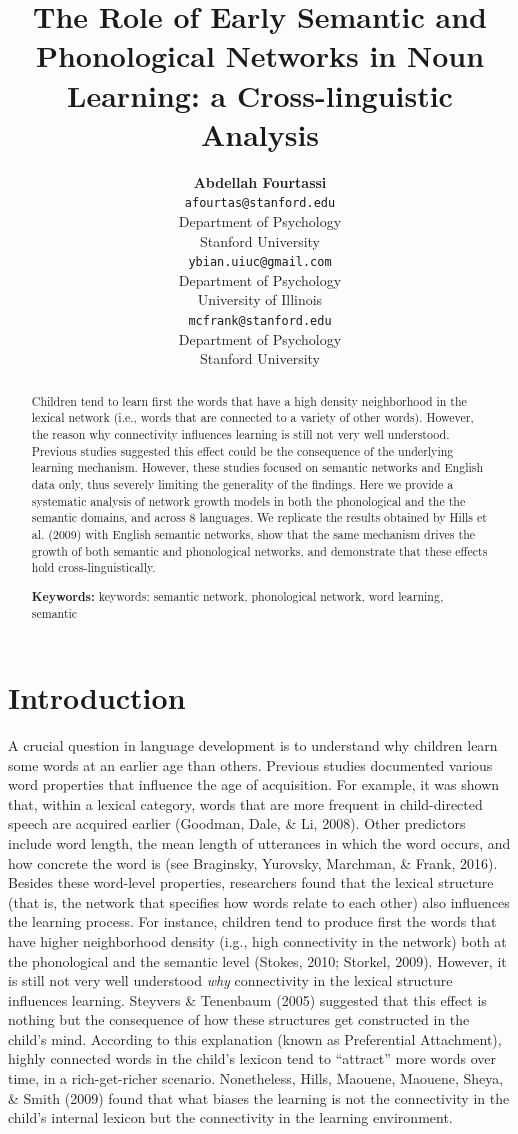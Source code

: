 \documentclass[10pt, letterpaper]{article}
\title{The Role of Early Semantic and Phonological Networks in Noun Learning: a
Cross-linguistic Analysis}
\author{{\large \bf Abdellah Fourtassi} \\ \texttt{afourtas@stanford.edu} \\ Department of Psychology \\ Stanford University \And {\large \bf Yuan Bian} \\ \texttt{ybian.uiuc@gmail.com} \\ Department of Psychology \\ University of Illinois \And {\large \bf Michael C. Frank} \\ \texttt{mcfrank@stanford.edu} \\ Department of Psychology \\ Stanford University}
\begin{document}
\maketitle

\begin{abstract}
Children tend to learn first the words that have a high density
neighborhood in the lexical network (i.e., words that are connected to a
variety of other words). However, the reason why connectivity influences
learning is still not very well understood. Previous studies suggested
this effect could be the consequence of the underlying learning
mechanism. However, these studies focused on semantic networks and
English data only, thus severely limiting the generality of the
findings. Here we provide a systematic analysis of network growth models
in both the phonological and the the semantic domains, and across 8
languages. We replicate the results obtained by Hills et al. (2009) with
English semantic networks, show that the same mechanism drives the
growth of both semantic and phonological networks, and demonstrate that
these effects hold cross-linguistically.

\textbf{Keywords:}
keywords: semantic network, phonological network, word learning,
semantic
\end{abstract}

\section{Introduction}\label{introduction}

A crucial question in language development is to understand why children
learn some words at an earlier age than others. Previous studies
documented various word properties that influence the age of
acquisition. For example, it was shown that, within a lexical category,
words that are more frequent in child-directed speech are acquired
earlier (Goodman, Dale, \& Li, 2008). Other predictors include word
length, the mean length of utterances in which the word occurs, and how
concrete the word is (see Braginsky, Yurovsky, Marchman, \& Frank,
2016). Besides these word-level properties, researchers found that the
lexical structure (that is, the network that specifies how words relate
to each other) also influences the learning process. For instance,
children tend to produce first the words that have higher neighborhood
density (i.g., high connectivity in the network) both at the
phonological and the semantic level (Stokes, 2010; Storkel, 2009).
However, it is still not very well understood \emph{why} connectivity in
the lexical structure influences learning. Steyvers \& Tenenbaum (2005)
suggested that this effect is nothing but the consequence of how these
structures get constructed in the child's mind. According to this
explanation (known as Preferential Attachment), highly connected words
in the child's lexicon tend to ``attract'' more words over time, in a
rich-get-richer scenario. Nonetheless, Hills, Maouene, Maouene, Sheya,
\& Smith (2009) found that what biases the learning is not the
connectivity in the child's internal lexicon but the connectivity in the
learning environment.
\end{document}
